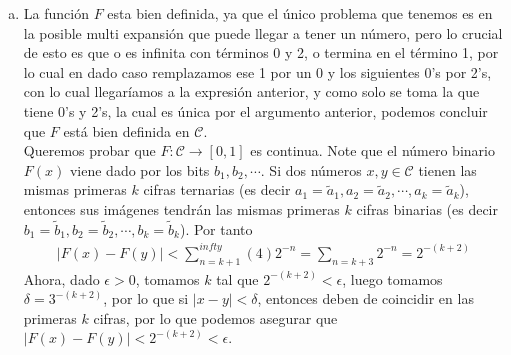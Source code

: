 \begin{solucion}
\begin{enumerate}[a)]
      De esta manera, usando un argumento inductivo, en el conjunto $\mathcal{C}_{i}$ con $i\geq 3$ solo se necesitarán las siguientes expansiones
      \begin{align*}
        \frac{1}{3^{i}}&=\sum_{k=i+1}^{\infty}(2)3^{-k}\\
        \frac{2}{3^{i}}&=\sum_{k\in\mathbb{Z}^{+}\setminus\{i\}}(0)3^{-k}+(2)3^{-i}.
      \end{align*}
      Por lo que al sumarlas con los anteriores se puede deducir que esta suma seguirá siendo una expansión con términos 0's y 2's.\\
      Si $x$ tiene una representación en la que todo $a_{k}$ es 0 o 2, entonces $x\in \mathcal{C}$.\\
      Note que en $\mathcal{C}_{n}$ Cantor remueve los intervalos abiertos que consisten en tener 1 en el $n$-ésimo lugar, luego por construcción, los $a_{k}$ con $k<n$ deben ser igual a $0$ o a $2$. Entonces como $x$ tiene expansión ternaria en la que $a_{k}$ es 0 o 2 para todo $k$, entonces $x\in \partial \mathcal{C}_{n}$ para todo $n$ y por ende $x\in \mathcal{C}$.
    \item La función $F$ esta bien definida, ya que el único problema que tenemos es en la posible multi expansión que puede llegar a tener un número, pero lo crucial de esto es que o es infinita con términos 0 y 2, o termina en el término 1, por lo cual en dado caso remplazamos ese 1 por un 0 y los siguientes 0's por 2's, con lo cual llegaríamos a la expresión anterior, y como solo se toma la que tiene 0's y 2's, la cual es única por el argumento anterior, podemos concluir que $F$ está bien definida en $\mathcal{C}$.\\
      Queremos probar que $F:\mathcal{C}\to[0,1]$ es continua. Note que el número binario $F(x)$ viene dado por los bits $b_{1},b_{2},\cdots$. Si dos números $x,y\in\mathcal{C}$ tienen las mismas primeras $k$ cifras ternarias (es decir $a_{1}=\tilde{a}_{1},a_{2}=\tilde{a}_{2},\cdots,a_{k}=\tilde{a}_{k}$), entonces sus imágenes tendrán las mismas primeras $k$ cifras binarias (es decir $b_{1}=\tilde{b}_{1},b_{2}=\tilde{b}_{2},\cdots,b_{k}=\tilde{b}_{k}$). Por tanto
      \begin{align*}
        |F(x)-F(y)|<\sum_{n=k+1}^{infty}(4)2^{-n}=\sum_{n=k+3}2^{-n}=2^{-(k+2)}
      \end{align*}
      Ahora, dado $\epsilon>0$, tomamos $k$ tal que $2^{-(k+2)}<\epsilon$, luego tomamos $\delta=3^{-(k+2)}$, por lo que si $|x-y|<\delta$, entonces deben de coincidir en las primeras $k$ cifras, por lo que podemos asegurar que $|F(x)-F(y)|<2^{-(k+2)}<\epsilon$.

\end{enumerate}
\end{solucion}
